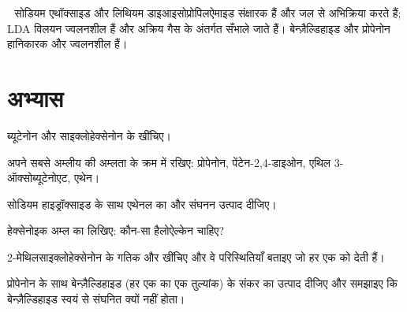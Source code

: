 \begin{safety}{\,\,}
सोडियम एथॉक्साइड और लिथियम डाइआइसोप्रोपिलऐमाइड संक्षारक हैं और जल से अभिक्रिया करते हैं; LDA विलयन
ज्वलनशील हैं और अक्रिय गैस के अंतर्गत सँभाले जाते हैं। बेन्ज़ैल्डिहाइड और प्रोपेनोन हानिकारक और ज्वलनशील हैं।
\end{safety}

\section{अभ्यास}

\begin{exercise}[$\star$]\label{exo:b2:enolates-aldol:1}
ब्यूटेनोन और साइक्लोहेक्सेनोन के   खींचिए।
\end{exercise}

\begin{exercise}[$\star$]\label{exo:b2:enolates-aldol:2}
अपने सबसे अम्लीय  की अम्लता के क्रम में रखिए: प्रोपेनोन, पेंटेन-2,4-डाइओन, एथिल 3-ऑक्सोब्यूटेनोएट,
एथेन।
\end{exercise}

\begin{exercise}[$\star$]\label{exo:b2:enolates-aldol:3}
सोडियम हाइड्रॉक्साइड के साथ एथेनल का  और संघनन उत्पाद दीजिए।
\end{exercise}

\begin{exercise}[$\star$]\label{exo:b2:enolates-aldol:4}
हेक्सेनोइक अम्ल का  लिखिए: कौन-सा हैलोऐल्केन चाहिए?
\end{exercise}

\begin{exercise}[$\star\star$]\label{exo:b2:enolates-aldol:5}
2-मेथिलसाइक्लोहेक्सेनोन के गतिक और  खींचिए और वे परिस्थितियाँ बताइए जो
हर एक को देती हैं।
\end{exercise}

\begin{exercise}[$\star\star$]\label{exo:b2:enolates-aldol:6}
प्रोपेनोन के साथ बेन्ज़ैल्डिहाइड (हर एक का एक तुल्यांक) के संकर  का उत्पाद दीजिए
और समझाइए कि बेन्ज़ैल्डिहाइड स्वयं से संघनित क्यों नहीं होता।
\end{exercise}

